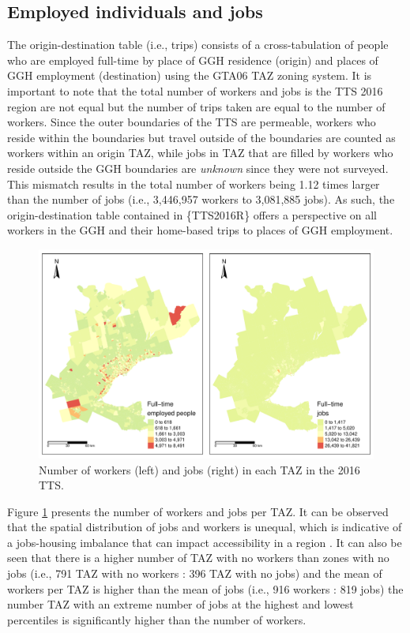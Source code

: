 \documentclass[Royal,times,sageh]{sagej}
\begin{document}
\hypertarget{employed-individuals-and-jobs}{%
\subsection{Employed individuals and
jobs}\label{employed-individuals-and-jobs}}

The origin-destination table (i.e., trips) consists of a
cross-tabulation of people who are employed full-time by place of GGH
residence (origin) and places of GGH employment (destination) using the
GTA06 TAZ zoning system. It is important to note that the total number
of workers and jobs is the TTS 2016 region are not equal but the number
of trips taken are equal to the number of workers. Since the outer
boundaries of the TTS are permeable, workers who reside within the
boundaries but travel outside of the boundaries are counted as workers
within an origin TAZ, while jobs in TAZ that are filled by workers who
reside outside the GGH boundaries are \emph{unknown} since they were not
surveyed. This mismatch results in the total number of workers being
1.12 times larger than the number of jobs (i.e., 3,446,957 workers to
3,081,885 jobs). As such, the origin-destination table contained in
\{TTS2016R\} offers a perspective on all workers in the GGH and their
home-based trips to places of GGH employment.

\begin{figure}
\includegraphics[width=1\linewidth]{Manuscript-Data-Package_files/figure-latex/tts-workers-jobs-plot-1} \caption{\label{fig:tts-workers-jobs-plot}Number of workers (left) and jobs (right) in each TAZ in the 2016 TTS.}\label{fig:tts-workers-jobs-plot}
\end{figure}

Figure \ref{fig:tts-workers-jobs-plot} presents the number of workers
and jobs per TAZ. It can be observed that the spatial distribution of
jobs and workers is unequal, which is indicative of a jobs-housing
imbalance that can impact accessibility in a region
\citep{Levine1998rethinking}. It can also be seen that there is a higher
number of TAZ with no workers than zones with no jobs (i.e., 791 TAZ
with no workers : 396 TAZ with no jobs) and the mean of workers per TAZ
is higher than the mean of jobs (i.e., 916 workers : 819 jobs) the
number TAZ with an extreme number of jobs at the highest and lowest
percentiles is significantly higher than the number of workers.
\end{document}
